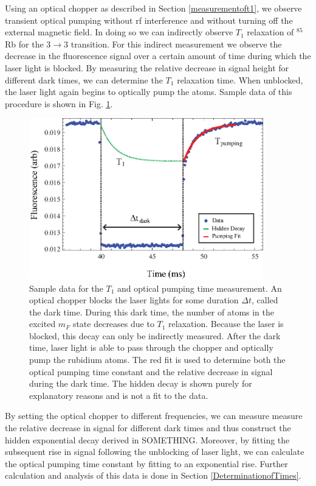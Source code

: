 Using an optical chopper as described in Section \ref{measurementoft1}, we observe transient optical pumping without rf interference and without turning off the external magnetic field.  In doing so we can indirectly observe $T_1$ relaxation of $^{85}$Rb for the $3 \rightarrow 3$ transition.  For this indirect measurement we observe the decrease in the fluorescence signal over a certain amount of time during which the laser light is blocked.  By measuring the relative decrease in signal height for different dark times, we can determine the $T_1$ relaxation time. When unblocked, the laser light again begins to optically pump the atoms.  Sample data of this procedure is shown in Fig. \ref{fig:chop}.
\begin{figure}[htbp]
\begin{center}
\includegraphics[height=70mm]{./figures/raw_chop.eps}
\caption{\small{Sample data for the $T_1$ and optical pumping time measurement.  An optical chopper blocks the laser lights for some duration $\Delta t$, called the dark time.  During this dark time, the number of atoms in the excited $m_F$ state decreases due to $T_1$ relaxation.  Because the laser is blocked, this decay can only be indirectly measured.  After the dark time, laser light is able to pass through the chopper and optically pump the rubidium atoms.  The red fit is used to determine both the optical pumping time constant and the relative decrease in signal during the dark time. The hidden decay is shown purely for explanatory reasons and is not a fit to the data.}}
\label{fig:chop}
\end{center}
\end{figure}
By setting the optical chopper to different frequencies, we can measure measure the relative decrease in signal for different dark times and thus construct the hidden exponential decay derived in SOMETHING.  Moreover, by fitting the subsequent rise in signal following the unblocking of laser light, we can calculate the optical pumping time constant by fitting to an exponential rise.  Further calculation and analysis of this data is done in Section \ref{DeterminationofTimes}.

